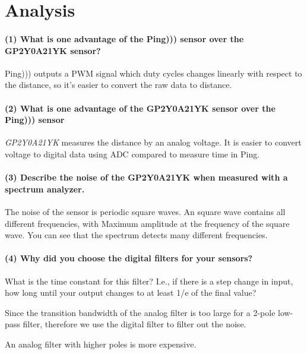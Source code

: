 \documentclass[a4paper]{article}
\begin{document}
\section{Analysis}

\paragraph{(1) What is one advantage of the Ping))) sensor over the GP2Y0A21YK sensor? \\ }

Ping))) outputs a PWM signal which duty cycles changes linearly with respect to the distance, so it's easier to convert the raw data to distance.

\paragraph{(2) What is one advantage of the \textbf{GP2Y0A21YK} sensor over the Ping))) sensor \\ }

\emph{GP2Y0A21YK} measures the distance by an analog voltage. It is easier to convert voltage to digital data using ADC compared to measure time in Ping.

\paragraph{(3) Describe the noise of the \textbf{GP2Y0A21YK} when measured with a spectrum analyzer. \\ }

The noise of the sensor is periodic square waves. An square wave contains all different frequencies, with Maximum amplitude at the frequency of the square wave.
You can see that the spectrum detects many different frequencies.

\paragraph{(4) Why did you choose the digital filters for your sensors? \\ }
What is the time constant for this filter? I.e., if there is a step change in input, how long until your output changes to at least 1/e of the final value?

Since the transition bandwidth of the analog filter is too large for a 2-pole low-pass filter, therefore we use the digital filter to filter out the noise. 

An analog filter with higher poles is more expensive. 
\end{document}
